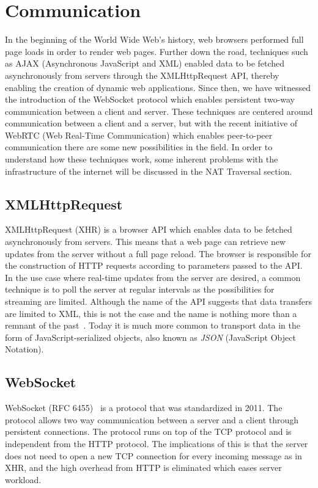 \section{Communication}
\label{sec:communication}
In the beginning of the World Wide Web's history, web browsers performed full page loads in order to render web pages. Further down the road, techniques such as AJAX (Asynchronous JavaScript and XML) enabled data to be fetched asynchronously from servers through the XMLHttpRequest API, thereby enabling the creation of dynamic web applications. Since then, we have witnessed the introduction of the WebSocket protocol which enables persistent two-way communication between a client and server. These techniques are centered around communication between a client and a server, but with the recent initiative of WebRTC (Web Real-Time Communication) which enables peer-to-peer communication there are some new possibilities in the field. In order to understand how these techniques work, some inherent problems with the infrastructure of the internet will be discussed in the NAT Traversal section.

\subsection{XMLHttpRequest}
XMLHttpRequest (XHR) is a browser API which enables data to be fetched asynchronously from servers. This means that a web page can retrieve new updates from the server without a full page reload. The browser is responsible for the construction of HTTP requests according to parameters passed to the API. In the use case where real-time updates from the server are desired, a common technique is to poll the server at regular intervals as the possibilities for streaming are limited. Although the name of the API suggests that data transfers are limited to XML, this is not the case and the name is nothing more than a remnant of the past~\cite{XHR:Online}. Today it is much more common to transport data in the form of JavaScript-serialized objects, also known as \emph{JSON} (JavaScript Object Notation).

\subsection{WebSocket}
WebSocket (RFC 6455)~\cite{RFC6455:Online} is a protocol that was standardized in 2011. The protocol allows two way communication between a server and a client through persistent connections. The protocol runs on top of the TCP protocol and is independent from the HTTP protocol. The implications of this is that the server does not need to open a new TCP connection for every incoming message as in XHR, and the high overhead from HTTP is eliminated which eases server workload.

